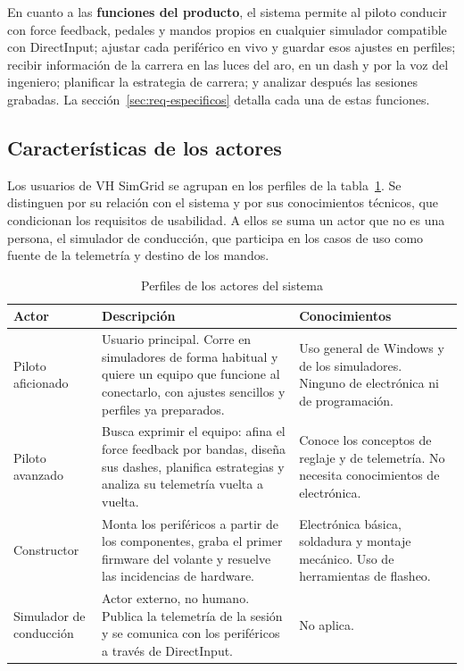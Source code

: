  En cuanto a las \textbf{funciones del producto}, el sistema permite al piloto conducir con force feedback, pedales y mandos propios en cualquier simulador compatible con DirectInput; ajustar cada periférico en vivo y guardar esos ajustes en perfiles; recibir información de la carrera en las luces del aro, en un dash y por la voz del ingeniero; planificar la estrategia de carrera; y analizar después las sesiones grabadas. La sección~\ref{sec:req-especificos} detalla cada una de estas funciones.
 
 
\subsection{Características de los actores}
\label{subsec:actores}

Los usuarios de VH SimGrid se agrupan en los perfiles de la tabla~\ref{tab:actores}. Se distinguen por su relación con el sistema y por sus conocimientos técnicos, que condicionan los requisitos de usabilidad. A ellos se suma un actor que no es una persona, el simulador de conducción, que participa en los casos de uso como fuente de la telemetría y destino de los mandos.

\begin{table}[H]
	\centering
	\renewcommand{\arraystretch}{1.5}
	\small
	\begin{tabularx}{\textwidth}{|>{\raggedright\arraybackslash}p{2.6cm}|>{\raggedright\arraybackslash}X|>{\raggedright\arraybackslash}p{3.9cm}|}
		\hline
		\textbf{Actor} & \textbf{Descripción} & \textbf{Conocimientos} \\
		\hline
		Piloto aficionado & Usuario principal. Corre en simuladores de forma habitual y quiere un equipo que funcione al conectarlo, con ajustes sencillos y perfiles ya preparados. & Uso general de Windows y de los simuladores. Ninguno de electrónica ni de programación. \\
		\hline
		Piloto avanzado & Busca exprimir el equipo: afina el force feedback por bandas, diseña sus dashes, planifica estrategias y analiza su telemetría vuelta a vuelta. & Conoce los conceptos de reglaje y de telemetría. No necesita conocimientos de electrónica. \\
		\hline
		Constructor & Monta los periféricos a partir de los componentes, graba el primer firmware del volante y resuelve las incidencias de hardware. & Electrónica básica, soldadura y montaje mecánico. Uso de herramientas de flasheo. \\
		\hline
		Simulador de conducción & Actor externo, no humano. Publica la telemetría de la sesión y se comunica con los periféricos a través de DirectInput. & No aplica. \\
		\hline
	\end{tabularx}
	\caption{Perfiles de los actores del sistema}
	\label{tab:actores}
\end{table}

